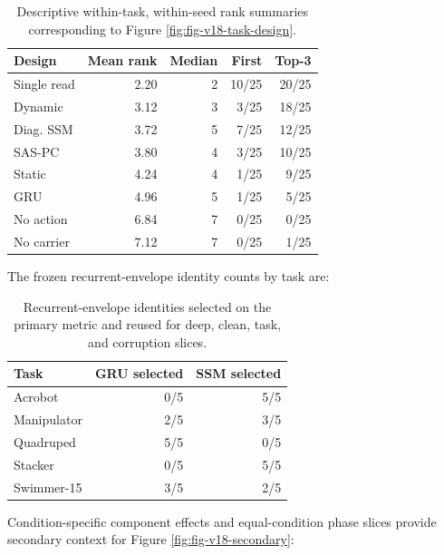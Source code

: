 \begin{table}[H]
\centering
\caption{Descriptive within-task, within-seed rank summaries corresponding to Figure \ref{fig:fig-v18-task-design}.}
\label{tbl:design-ranks}
\small
\begin{tabular}{@{}lrrrr@{}}
\toprule
\textcolor{NVIDIADark}{\textbf{Design}} & \textcolor{NVIDIADark}{\textbf{Mean rank}} & \textcolor{NVIDIADark}{\textbf{Median}} & \textcolor{NVIDIADark}{\textbf{First}} & \textcolor{NVIDIADark}{\textbf{Top-3}} \\
\midrule
Single read & 2.20 & 2 & 10/25 & 20/25 \\
Dynamic & 3.12 & 3 & 3/25 & 18/25 \\
Diag. SSM & 3.72 & 5 & 7/25 & 12/25 \\
SAS-PC & 3.80 & 4 & 3/25 & 10/25 \\
Static & 4.24 & 4 & 1/25 & 9/25 \\
GRU & 4.96 & 5 & 1/25 & 5/25 \\
No action & 6.84 & 7 & 0/25 & 0/25 \\
No carrier & 7.12 & 7 & 0/25 & 1/25 \\
\bottomrule
\end{tabular}
\end{table}

The frozen recurrent-envelope identity counts by task are:

\begin{table}[H]
\centering
\caption{Recurrent-envelope identities selected on the primary metric and reused for deep, clean, task, and corruption slices.}
\label{tbl:recurrent-identities}
\small
\begin{tabular}{@{}lrr@{}}
\toprule
\textcolor{NVIDIADark}{\textbf{Task}} & \textcolor{NVIDIADark}{\textbf{GRU selected}} & \textcolor{NVIDIADark}{\textbf{SSM selected}} \\
\midrule
Acrobot & 0/5 & 5/5 \\
Manipulator & 2/5 & 3/5 \\
Quadruped & 5/5 & 0/5 \\
Stacker & 0/5 & 5/5 \\
Swimmer-15 & 3/5 & 2/5 \\
\bottomrule
\end{tabular}
\end{table}

Condition-specific component effects and equal-condition phase slices
provide secondary context for Figure \ref{fig:fig-v18-secondary}:

